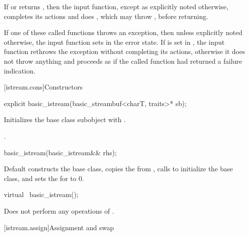 \pnum
If
or
returns
,
then the input function, except as explicitly noted otherwise, completes its actions and does
,
which may throw
, before returning.

\pnum
If one of these called functions throws an exception, then unless explicitly noted otherwise,
the input function sets
in the error state.
If
is set in
,
the input function
rethrows the exception without completing its actions, otherwise
it does not throw anything and proceeds as if the called function had returned
a failure indication.

[istream.cons]{Constructors}

%
\begin{itemdecl}
explicit basic_istream(basic_streambuf<charT, traits>* sb);
\end{itemdecl}

%
\begin{itemdescr}
\pnum
\effects
Initializes the base class subobject with
.

\pnum
\ensures
{}.
\end{itemdescr}


%
\begin{itemdecl}
basic_istream(basic_istream&& rhs);
\end{itemdecl}

\begin{itemdescr}
\pnum
\effects
Default constructs the base class, copies the
 from , calls
 to initialize the base
class, and sets the  for  to 0.
\end{itemdescr}

%
\begin{itemdecl}
virtual ~basic_istream();
\end{itemdecl}

\begin{itemdescr}
\pnum
\remarks
Does not perform any operations of
.
\end{itemdescr}

[istream.assign]{Assignment and swap}

